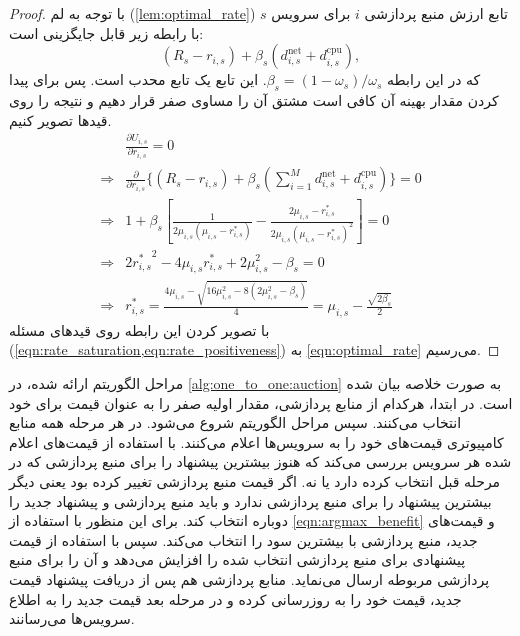       \begin{proof}
        با توجه به لم (\ref{lem:optimal_rate}) تابع ارزش منبع پردازشی $i$ برای سرویس $s$ با رابطه زیر قابل جایگزینی است:
        \begin{equation}
          (R_s - r_{i,s}) + \beta_s(d_{i,s}^{\text{net}} + d_{i,s}^{\text{cpu}}),
        \end{equation} 
        که در این رابطه $\beta_s=(1-\omega_s)/\omega_s$.
        این تابع یک تابع محدب است.
        پس برای پیدا کردن مقدار بهینه آن کافی است مشتق آن را مساوی صفر قرار دهیم و نتیجه را روی قید‌ها تصویر کنیم.
        \begin{align*}
          & \frac{\partial U_{i,s}}{\partial r_{i,s}} = 0 \\
          \Rightarrow &\frac{\partial}{\partial r_{i,s}}\{(R_s - r_{i,s}) + \beta_s(\sum_{i=1}^M d_{i,s}^{\text{net}} + d_{i,s}^{\text{cpu}})\} = 0 \\
          \Rightarrow & 1 + \beta_s[ \frac{1}{2\mu_{i,s}(\mu_{i,s}-r_{i,s}^*)} - \frac{2\mu_{i,s}-r_{i,s}^*}{2\mu_{i,s}(\mu_{i,s}-r_{i,s}^*)^2}] = 0 \\
          \Rightarrow & 2 {r_{i,s}^*}^2 - 4 \mu_{i,s} r_{i,s}^* + 2 \mu_{i,s}^2 - \beta_s = 0 \\
          \Rightarrow & r_{i,s}^* = \frac{4 \mu_{i,s} - \sqrt{16 \mu_{i,s}^2 - 8(2\mu_{i,s}^2 - \beta_s)}}{4} = \mu_{i,s} - \frac{\sqrt{2\beta_s}}{2}
        \end{align*}
        با تصویر کردن این رابطه روی قید‌های مسئله (\cref{eqn:rate_saturation,eqn:rate_positiveness}) به \cref{eqn:optimal_rate} می‌رسیم.
      \end{proof}  

      مراحل الگوریتم ارائه شده، در \cref{alg:one_to_one:auction} به صورت خلاصه بیان شده است.
      در ابتدا، هرکدام از منابع پردازشی، مقدار اولیه صفر را به عنوان قیمت برای خود انتخاب می‌کنند.
      سپس مراحل الگوریتم شروع می‌شود.
      در هر مرحله همه منابع کامپیوتری قیمت‌های خود را به سرویس‌ها اعلام می‌کنند.
      با استفاده از قیمت‌های اعلام شده هر سرویس بررسی می‌کند که هنوز بیشترین پیشنهاد را برای منبع پردازشی که در مرحله قبل انتخاب کرده دارد یا نه.
      اگر قیمت منبع پردازشی تغییر کرده بود یعنی دیگر بیشترین پیشنهاد را برای منبع پردازشی ندارد و باید منبع پردازشی و پیشنهاد جدید را دوباره انتخاب کند.
      برای این منظور با استفاده از \cref{eqn:argmax_benefit} و قیمت‌های جدید، منبع پردازشی با بیشترین سود را انتخاب می‌کند.
      سپس با استفاده از  قیمت پیشنهادی برای منبع پردازشی انتخاب شده را افزایش می‌دهد و آن را برای منبع پردازشی مربوطه ارسال می‌نماید.
      منابع پردازشی هم پس از دریافت پیشنهاد قیمت جدید، قیمت خود را به روزرسانی کرده و در مرحله بعد قیمت جدید را به اطلاع سرویس‌ها می‌رسانند.
      
